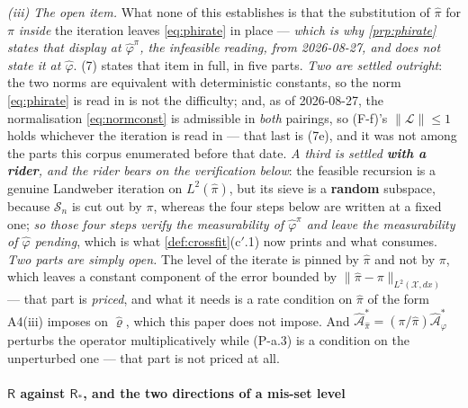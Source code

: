 \emph{(iii) The open item.} What none of this establishes is that the substitution of $\hat\pi$ for
$\pi$ \emph{inside} the iteration leaves \eqref{eq:phirate} in place --- \emph{which is why
\cref{prp:phirate} states that display at $\hat\varphi^{\pi}$, the infeasible reading, from 2026-08-27,
and does not state it at $\hat\varphi$}.
\textup{(7)} states that item in full, in five parts. \emph{Two are settled
outright}: the two norms are
equivalent with deterministic constants, so the norm \eqref{eq:phirate} is read in is not the
difficulty; and, as of 2026-08-27, the normalisation \eqref{eq:normconst} is admissible in \emph{both}
pairings, so \textup{(F-f)}'s $\|\mathcal L\|\le1$ holds whichever the iteration is read in --- that
last is \textup{(7e)}, and it was not among the parts this corpus enumerated before that date.
\emph{A third is settled \textbf{with a rider}, and the rider bears on the
verification below}: the feasible recursion is a genuine Landweber iteration on $L^{2}(\hat\pi)$, but
its sieve is a \textbf{random} subspace, because $\mathcal S_n$ is cut out
by $\pi$, whereas the four steps below are written at a fixed one; \emph{so those four steps verify the
measurability of $\hat\varphi^{\pi}$ and leave the measurability of $\hat\varphi$ pending}, which is
what \cref{def:crossfit}\textup{(c$'$.1)} now prints and what  consumes.
\emph{Two parts are simply open.} The level of the iterate is pinned by $\hat\pi$ and not by $\pi$, which
leaves a constant component of the error bounded by $\|\hat\pi-\pi\|_{L^{2}(\mathcal X,dx)}$ --- that
part is \emph{priced}, and what it needs is a rate condition on $\hat\pi$ of the form A4(iii) imposes on
$\hat\varrho$, which this paper does not impose. And
$\hat{\mathcal A}^\ast_{\hat\pi}=(\pi/\hat\pi)\hat{\mathcal A}^\ast_\varphi$ perturbs the operator
multiplicatively while (P-a.3) is a condition on the unperturbed one --- that part is not priced at all.

\paragraph{$\mathsf R$ against $\mathsf R_\ast$, and the two directions of a mis-set level}

